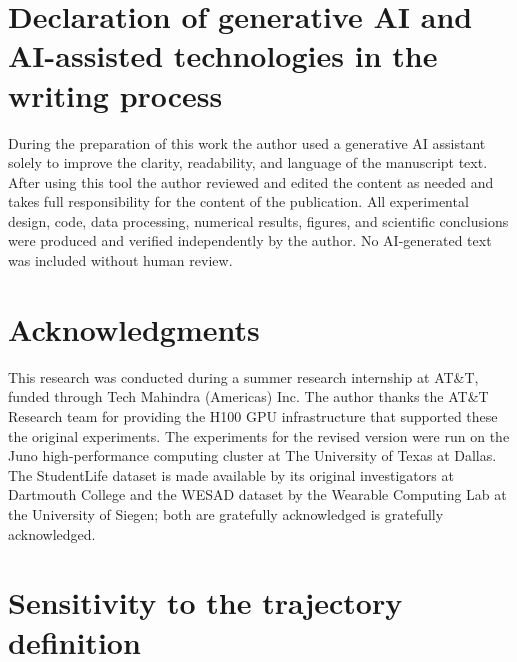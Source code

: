 \documentclass[preprint,12pt,authoryear]{elsarticle}
\providecommand{\DIFaddtex}[1]{{\protect\color{blue} \sf #1}} %
\providecommand{\DIFdeltex}[1]{{\protect\color{red} \scriptsize #1}} %
\providecommand{\DIFaddbegin}{} %
\providecommand{\DIFaddend}{} %
\providecommand{\DIFdelbegin}{} %
\providecommand{\DIFdelend}{} %
\providecommand{\DIFadd}[1]{\texorpdfstring{\DIFaddtex{#1}}{#1}} %
\providecommand{\DIFdel}[1]{\texorpdfstring{\DIFdeltex{#1}}{}} %
\newcommand{\DIFscaledelfig}{0.5}
\newlength{\DIFdelgraphicswidth} %
\newlength{\DIFdelgraphicsheight} %
\newcommand{\DIFaddincludegraphics}[2][]{{\color{blue}\fbox{\DIFOincludegraphics[#1]{#2}}}} %
\newcommand{\DIFdelincludegraphics}[2][]{%
\sbox{\DIFdelgraphicsbox}{\DIFOincludegraphics[#1]{#2}}%
\settoboxwidth{\DIFdelgraphicswidth}{\DIFdelgraphicsbox} %
\settoboxtotalheight{\DIFdelgraphicsheight}{\DIFdelgraphicsbox} %
\scalebox{\DIFscaledelfig}{%
\parbox[b]{\DIFdelgraphicswidth}{\usebox{\DIFdelgraphicsbox}\\[-\baselineskip] \rule{\DIFdelgraphicswidth}{0em}}\llap{\resizebox{\DIFdelgraphicswidth}{\DIFdelgraphicsheight}{%
\setlength{\unitlength}{\DIFdelgraphicswidth}%
\begin{picture}(1,1)%
\thicklines\linethickness{2pt} %
{\color[rgb]{1,0,0}\put(0,0){\framebox(1,1){}}}%
{\color[rgb]{1,0,0}\put(0,0){\line( 1,1){1}}}%
{\color[rgb]{1,0,0}\put(0,1){\line(1,-1){1}}}%
\end{picture}%
}\hspace*{3pt}}} %
} %
\DeclareRobustCommand{\DIFaddbegin}{\DIFOaddbegin \let\includegraphics\DIFaddincludegraphics} %
\DeclareRobustCommand{\DIFaddend}{\DIFOaddend \let\includegraphics\DIFOincludegraphics} %
\DeclareRobustCommand{\DIFdelbegin}{\DIFOdelbegin \let\includegraphics\DIFdelincludegraphics} %
\DeclareRobustCommand{\DIFdelend}{\DIFOaddend \let\includegraphics\DIFOincludegraphics} %
\begin{document}
\section*{Declaration of generative AI and AI-assisted technologies in
the writing process}

During the preparation of this work the author used a generative AI
assistant solely to improve the clarity, readability, and language of the
manuscript text. After using this tool the author reviewed and edited
the content as needed and takes full responsibility for the content of
the publication. All experimental design, code, data processing,
numerical results, figures, and scientific conclusions were produced and
verified independently by the author. No AI-generated text was included
without human review.

\section*{Acknowledgments}

This research was conducted during a summer research internship at
AT\&T, funded through Tech Mahindra (Americas) Inc. The author thanks
the AT\&T Research team for providing the H100 GPU infrastructure that
supported \DIFdelbegin \DIFdel{these }\DIFdelend \DIFaddbegin \DIFadd{the original }\DIFaddend experiments. The \DIFaddbegin \DIFadd{experiments for the revised
version were run on the Juno high-performance computing cluster at The
University of Texas at Dallas. The }\DIFaddend StudentLife dataset is made
available by its original investigators at Dartmouth College and \DIFdelbegin \DIFdel{the WESAD dataset
by the Wearable Computing Lab at the University of
Siegen; both are gratefully acknowledged}\DIFdelend \DIFaddbegin \DIFadd{is
gratefully acknowledged.
}

\appendix
\section{Sensitivity to the trajectory definition}
\label{app:maxprob}
\end{document}
